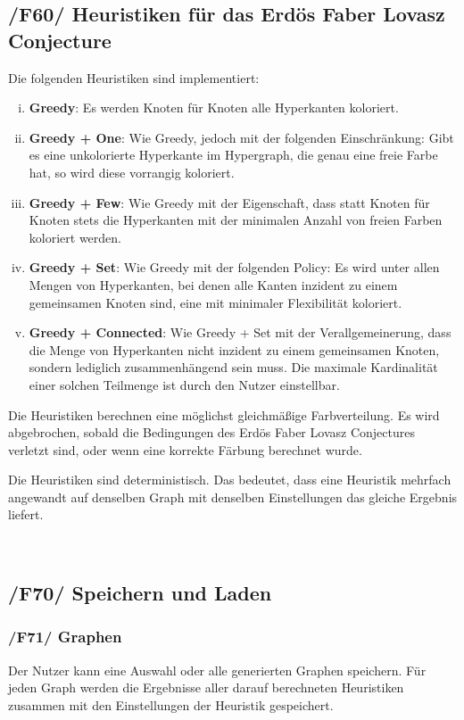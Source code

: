 \documentclass{article}
\begin{document}
	\subsection*{/F60/ Heuristiken für das Erdös Faber Lovasz Conjecture} \label{f60} 
	Die folgenden Heuristiken sind implementiert:
	\begin{enumerate}[i)]
		\item{\textbf{Greedy}: Es werden Knoten für Knoten alle Hyperkanten koloriert.}
		\item{\textbf{Greedy + One}: Wie Greedy, jedoch mit der folgenden Einschränkung: Gibt es eine unkolorierte Hyperkante im Hypergraph, die genau eine freie Farbe hat, so wird diese vorrangig koloriert.}
		\item{\textbf{Greedy + Few}: Wie Greedy mit der Eigenschaft, dass statt Knoten für Knoten stets die Hyperkanten mit der minimalen Anzahl von freien Farben koloriert werden.}
		\item{\textbf{Greedy + Set}: Wie Greedy mit der folgenden Policy: Es wird unter allen Mengen von Hyperkanten, bei denen alle Kanten inzident zu einem gemeinsamen Knoten sind, eine mit minimaler Flexibilität koloriert.}
		\item{\textbf{Greedy + Connected}: Wie Greedy + Set mit der Verallgemeinerung, dass die Menge von Hyperkanten nicht inzident zu einem gemeinsamen Knoten, sondern lediglich zusammenhängend sein muss. Die maximale Kardinalität einer solchen Teilmenge ist durch den Nutzer einstellbar.}
	\end{enumerate}
	
	Die Heuristiken berechnen eine möglichst gleichmäßige Farbverteilung.	
	Es wird abgebrochen, sobald die Bedingungen des Erdös Faber Lovasz Conjectures verletzt sind, oder wenn eine korrekte Färbung berechnet wurde. 
	
	Die Heuristiken sind deterministisch. Das bedeutet, dass eine Heuristik mehrfach angewandt auf denselben Graph mit denselben Einstellungen das gleiche Ergebnis liefert.
	
	
	~\newpage
	\subsection*{/F70/ Speichern und Laden} \label{f70} 
	
	\subsubsection*{/F71/ Graphen} \label{f71} 
	Der Nutzer kann eine Auswahl oder alle generierten Graphen speichern. Für jeden Graph werden die Ergebnisse aller darauf berechneten Heuristiken zusammen mit den Einstellungen der Heuristik gespeichert.
	
\end{document}
